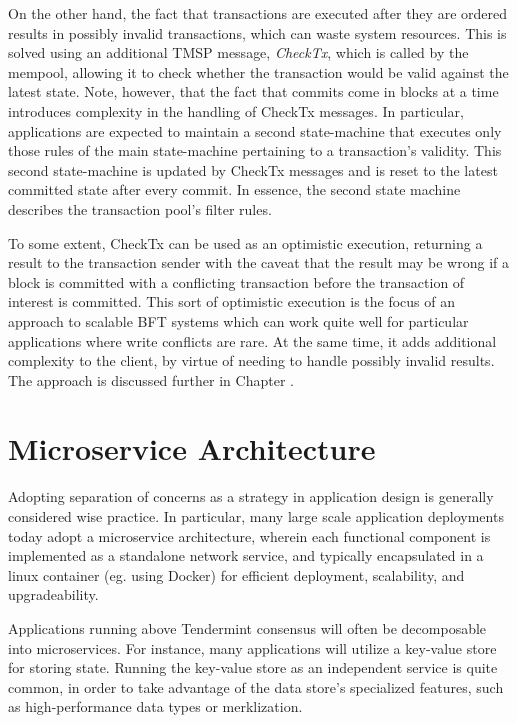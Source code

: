 On the other hand, the fact that transactions are executed after they are ordered results in possibly invalid transactions,
which can waste system resources. 
This is solved using an additional TMSP message, \emph{CheckTx}, which is called by the mempool,
allowing it to check whether the transaction would be valid against the latest state.
Note, however, that the fact that commits come in blocks at a time introduces complexity in the handling of CheckTx messages.
In particular, applications are expected to maintain a second state-machine that executes only those rules of the main state-machine pertaining to a transaction's validity. 
This second state-machine is updated by CheckTx messages and is reset to the latest committed state after every commit.
In essence, the second state machine describes the transaction pool's filter rules.

To some extent, CheckTx can be used as an optimistic execution, 
returning a result to the transaction sender with the caveat that the result may be wrong if a block is committed with a conflicting transaction
before the transaction of interest is committed.
This sort of optimistic execution is the focus of an approach to scalable BFT systems which can work quite well for particular applications where write conflicts
are rare. 
At the same time, it adds additional complexity to the client, by virtue of needing to handle possibly invalid results.
The approach is discussed further in Chapter \cite{ch:related}.

\section{Microservice Architecture}

Adopting separation of concerns as a strategy in application design is generally considered wise practice.
In particular, many large scale application deployments today adopt a microservice architecture,
wherein each functional component is implemented as a standalone network service, 
and typically encapsulated in a linux container (eg. using Docker) for efficient deployment, scalability, and upgradeability.

Applications running above Tendermint consensus will often be decomposable into microservices.
For instance, many applications will utilize a key-value store for storing state.
Running the key-value store as an independent service is quite common, 
in order to take advantage of the data store's specialized features, such as high-performance data types or merklization.

